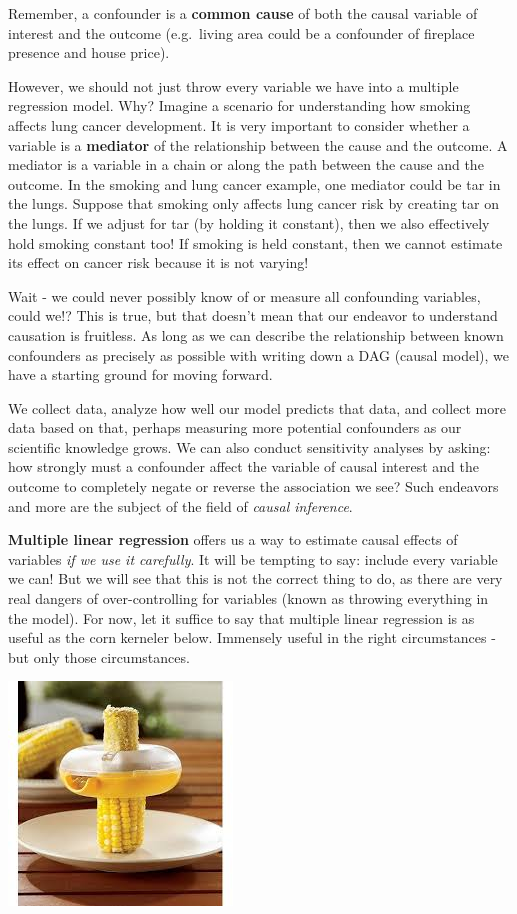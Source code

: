 \documentclass[
]{book}
\begin{document}
Remember, a confounder is a \textbf{common cause} of both the causal variable of interest and the outcome (e.g.~living area could be a confounder of fireplace presence and house price).

However, we should not just throw every variable we have into a multiple regression model. Why? Imagine a scenario for understanding how smoking affects lung cancer development. It is very important to consider whether a variable is a \textbf{mediator} of the relationship between the cause and the outcome. A mediator is a variable in a chain or along the path between the cause and the outcome. In the smoking and lung cancer example, one mediator could be tar in the lungs. Suppose that smoking only affects lung cancer risk by creating tar on the lungs. If we adjust for tar (by holding it constant), then we also effectively hold smoking constant too! If smoking is held constant, then we cannot estimate its effect on cancer risk because it is not varying!

Wait - we could never possibly know of or measure all confounding variables, could we!? This is true, but that doesn't mean that our endeavor to understand causation is fruitless. As long as we can describe the relationship between known confounders as precisely as possible with writing down a DAG (causal model), we have a starting ground for moving forward.

We collect data, analyze how well our model predicts that data, and collect more data based on that, perhaps measuring more potential confounders as our scientific knowledge grows. We can also conduct sensitivity analyses by asking: how strongly must a confounder affect the variable of causal interest and the outcome to completely negate or reverse the association we see? Such endeavors and more are the subject of the field of \emph{causal inference}.

\textbf{Multiple linear regression} offers us a way to estimate causal effects of variables \emph{if we use it carefully}. It will be tempting to say: include every variable we can! But we will see that this is not the correct thing to do, as there are very real dangers of over-controlling for variables (known as throwing everything in the model). For now, let it suffice to say that multiple linear regression is as useful as the corn kerneler below. Immensely useful in the right circumstances - but only those circumstances.

\includegraphics{Photos/corn.jpeg}
\end{document}
